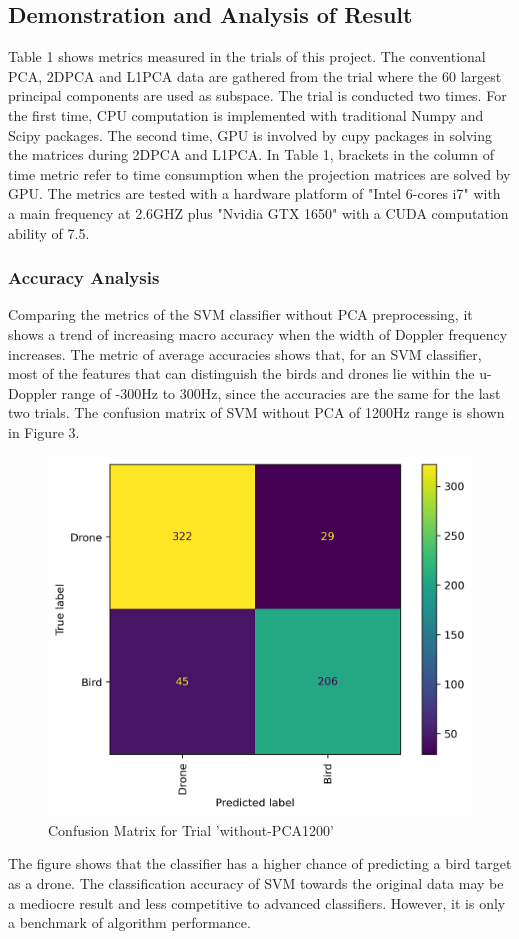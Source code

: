 \documentclass{cta-author}
\begin{document}
\subsection{Demonstration and Analysis of Result}
Table 1 shows metrics measured in the trials of this project. The conventional PCA, 2DPCA and L1PCA data are gathered from the trial where the 60 largest principal components are used as subspace. 
The trial is conducted two times. For the first time, CPU computation is implemented with traditional Numpy and Scipy packages. The second time, GPU is involved by cupy packages in solving the matrices during 2DPCA and L1PCA.
In Table 1, brackets in the column of time metric refer to time consumption when the projection matrices are solved by GPU.
The metrics are tested with a hardware platform of "Intel 6-cores i7" with a main frequency at 2.6GHZ plus "Nvidia GTX 1650" with a CUDA computation ability of 7.5.
\subsubsection{Accuracy Analysis}
Comparing the metrics of the SVM classifier without PCA preprocessing, it shows a trend of increasing macro accuracy when the width of Doppler frequency increases. 
The metric of average accuracies shows that, for an SVM classifier, most of the features that can distinguish the birds and drones lie within the u-Doppler range of -300Hz to 300Hz, since the accuracies are the same for the last two trials.
The confusion matrix of SVM without PCA of 1200Hz range is shown in Figure 3.
\begin{figure}[h]
\centering\includegraphics[scale = 0.5]{Image/without_PCA1201binCFM.png}
\caption{Confusion Matrix for Trial 'without-PCA1200'}
\end{figure}
The figure shows that the classifier has a higher chance of predicting a bird target as a drone.
The classification accuracy of SVM towards the original data may be a mediocre result and less competitive to advanced classifiers. However, it is only a benchmark of algorithm performance. 
\end{document}
